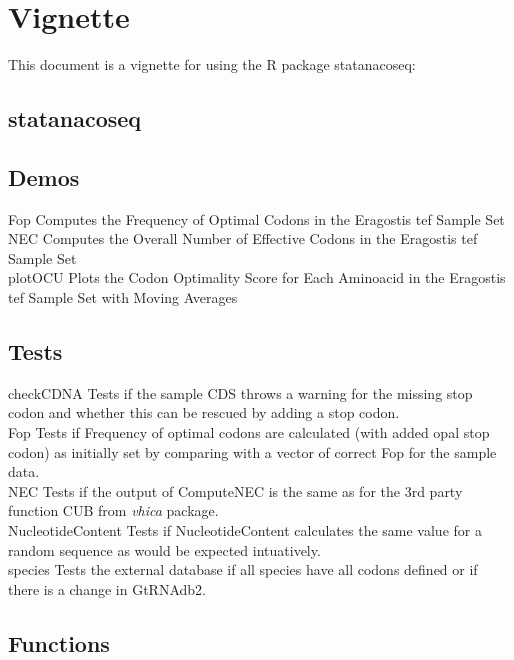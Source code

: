 \chapter{Vignette}
This document is a vignette for using the R package statanacoseq:


\section{statanacoseq}


\section{Demos}
Fop \quad Computes the Frequency of Optimal Codons in the Eragostis tef Sample Set \\
NEC \quad Computes the Overall Number of Effective Codons in the Eragostis tef Sample Set \\
plotOCU \quad Plots the Codon Optimality Score for Each Aminoacid in the Eragostis tef Sample Set with Moving Averages \\


\section{Tests}
checkCDNA \quad Tests if the sample CDS throws a warning for the missing stop codon and whether this can be rescued by adding a stop codon. \\
Fop \quad Tests if Frequency of optimal codons are calculated (with added opal stop codon) as initially set by comparing with a vector of correct Fop for the sample data. \\
NEC \quad Tests if the output of ComputeNEC is the same as for the 3rd party function CUB from \textit{vhica} package. \\
NucleotideContent \quad Tests if NucleotideContent calculates the same value for a random sequence as would be expected intuatively. \\
species \quad Tests the external database if all species have all codons defined or if there is a change in  GtRNAdb2. \\

\section{Functions}

